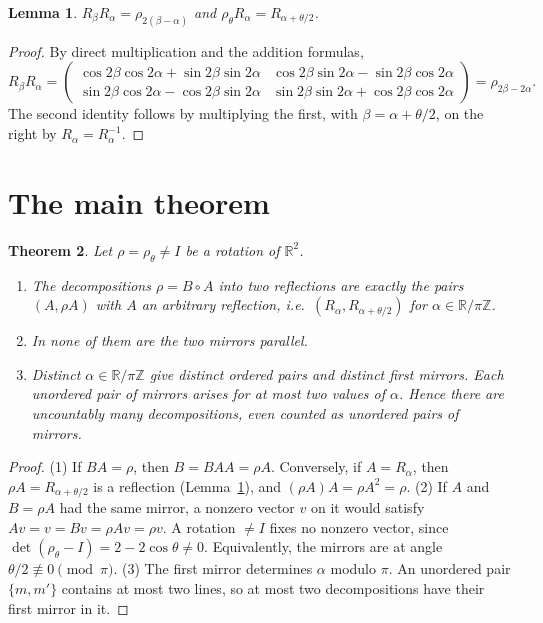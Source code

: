\documentclass[11pt]{article}
\newtheorem{theorem}{Theorem}
\newtheorem{lemma}[theorem]{Lemma}
\theoremstyle{definition}
\theoremstyle{remark}
\newcommand{\R}{\mathbb R}
\newcommand{\Z}{\mathbb Z}
\begin{document}
\begin{lemma}\label{lem:product}
$R_\beta R_\alpha=\rho_{2(\beta-\alpha)}$ and $\rho_\theta R_\alpha=R_{\alpha+\theta/2}$.
\end{lemma}
\begin{proof}
By direct multiplication and the addition formulas,
\[
R_\beta R_\alpha=\begin{pmatrix}\cos2\beta\cos2\alpha+\sin2\beta\sin2\alpha&
\cos2\beta\sin2\alpha-\sin2\beta\cos2\alpha\\ \sin2\beta\cos2\alpha-\cos2\beta\sin2\alpha&
\sin2\beta\sin2\alpha+\cos2\beta\cos2\alpha\end{pmatrix}=\rho_{2\beta-2\alpha}.
\]
The second identity follows by multiplying the first, with $\beta=\alpha+\theta/2$, on the right
by $R_\alpha=R_\alpha^{-1}$.
\end{proof}

\section{The main theorem}

\begin{theorem}\label{thm:main}
Let $\rho=\rho_\theta\neq I$ be a rotation of $\R^2$.
\begin{enumerate}
\item The decompositions $\rho=B\circ A$ into two reflections are exactly the pairs
$(A,\rho A)$ with $A$ an arbitrary reflection, i.e.\ $(R_\alpha,R_{\alpha+\theta/2})$ for
$\alpha\in\R/\pi\Z$.
\item In none of them are the two mirrors parallel.
\item Distinct $\alpha\in\R/\pi\Z$ give distinct ordered pairs and distinct first mirrors. Each
unordered pair of mirrors arises for at most two values of $\alpha$. Hence there are
uncountably many decompositions, even counted as unordered pairs of mirrors.
\end{enumerate}
\end{theorem}
\begin{proof}
(1) If $BA=\rho$, then $B=BAA=\rho A$. Conversely, if $A=R_\alpha$, then
$\rho A=R_{\alpha+\theta/2}$ is a reflection (Lemma~\ref{lem:product}), and $(\rho A)A=\rho A^2=\rho$.
(2) If $A$ and $B=\rho A$ had the same mirror, a nonzero vector $v$ on it would satisfy
$Av=v=Bv=\rho Av=\rho v$. A rotation $\neq I$ fixes no nonzero vector, since
$\det(\rho_\theta-I)=2-2\cos\theta\neq0$. Equivalently, the mirrors are at angle
$\theta/2\not\equiv0\pmod\pi$.
(3) The first mirror determines $\alpha$ modulo $\pi$. An unordered pair $\{m,m'\}$ contains at
most two lines, so at most two decompositions have their first mirror in it.
\end{proof}
\end{document}

